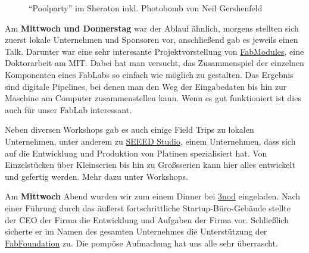 \documentclass{\basedir/fablab-document}
\begin{document}
\begin{figure}[htbp]
	\noindent{}
	\caption{``Poolparty'' im Sheraton inkl. Photobomb von Neil Gershenfeld}
	\label{photobomb-neil}
\end{figure}

Am \textbf{Mittwoch und Donnerstag} war der Ablauf ähnlich, morgens
stellten sich zuerst lokale Unternehmen und Sponsoren vor, anschließend
gab es jeweils einen Talk. Darunter war eine sehr interssante
Projektvorstellung von \href{http://fabmodules.org/}{FabModules}, eine
Doktorarbeit am MIT. Dabei hat man versucht, das Zusammenspiel der
einzelnen Komponenten eines FabLabs so einfach wie möglich zu gestalten.
Das Ergebnis sind digitale Pipelines, bei denen man den Weg der
Eingabedaten bis hin zur Maschine am Computer zusammenstellen kann. Wenn
es gut funktioniert ist dies auch für unser FabLab interessant.

Neben diversen Workshops gab es auch einige Field Trips zu lokalen
Unternehmen, unter anderem zu \href{https://www.seeedstudio.com/}{SEEED
Studio}, einem Unternehmen, dass sich auf die Entwicklung und Produktion
von Platinen spezialisiert hat. Von Einzelstücken über Kleinserien bis
hin zu Großsserien kann hier alles entwickelt und gefertig werden. Mehr
dazu unter Workshops.

Am \textbf{Mittwoch} Abend wurden wir zum einem Dinner bei 
\href{https://www.3nod.com.cn/en/}{3nod} eingeladen. Nach einer
Führung durch das äußerst fortschrittliche Startup-Büro-Gebäude stellte
der CEO der Firma die Entwicklung und Aufgaben der Firma vor.
Schließlich sicherte er im Namen des gesamten Unternehmes die
Unterstützung der \href{https://fabfoundation.org/}{FabFoundation} zu.
Die pompöse Aufmachung hat uns alle sehr überrascht.
\end{document}
